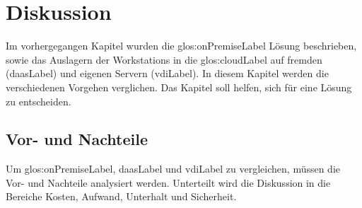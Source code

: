 
\chapter{Diskussion}
Im vorhergegangen Kapitel wurden die \gls{glos:onPremiseLabel} Lösung beschrieben, sowie das Auslagern der Workstations in die \Gls{glos:cloudLabel} auf fremden (\Gls{daasLabel}) und eigenen Servern (\Gls{vdiLabel}). In diesem Kapitel werden die verschiedenen Vorgehen verglichen. Das Kapitel soll helfen, sich für eine Lösung zu entscheiden.


\section{Vor- und Nachteile}




Um \gls{glos:onPremiseLabel}, \Gls{daasLabel} und \Gls{vdiLabel} zu vergleichen, müssen die Vor- und Nachteile analysiert werden.
Unterteilt wird die Diskussion in die Bereiche Kosten, Aufwand, Unterhalt und Sicherheit.

